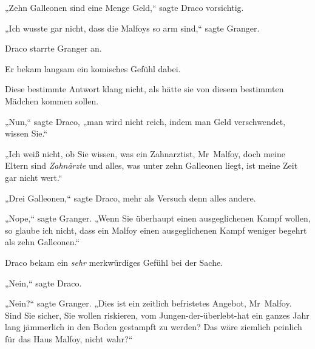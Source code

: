 „Zehn Galleonen sind eine Menge Geld,“ sagte Draco vorsichtig.

„Ich wusste gar nicht, dass die Malfoys so arm sind,“ sagte Granger.

Draco starrte Granger an.

Er bekam langsam ein komisches Gefühl dabei.

Diese bestimmte Antwort klang nicht, als hätte sie von diesem bestimmten Mädchen kommen sollen.

„Nun,“ sagte Draco, „man wird nicht reich, indem man Geld verschwendet, wissen Sie.“

„Ich weiß nicht, ob Sie wissen, was ein Zahnarztist, Mr~Malfoy, doch meine Eltern sind \emph{Zahnärzte} und alles, was unter zehn Galleonen liegt, ist meine Zeit gar nicht wert.“

„Drei Galleonen,“ sagte Draco, mehr als Versuch denn alles andere.

„Nope,“ sagte Granger. „Wenn Sie überhaupt einen ausgeglichenen Kampf wollen, so glaube ich nicht, dass ein Malfoy einen ausgeglichenen Kampf weniger begehrt als zehn Galleonen.“

Draco bekam ein \emph{sehr} merkwürdiges Gefühl bei der Sache.

„Nein,“ sagte Draco.

„Nein?“ sagte Granger. „Dies ist ein zeitlich befristetes Angebot, Mr~Malfoy. Sind Sie sicher, Sie wollen riskieren, vom Jungen-der-überlebt-hat ein ganzes Jahr lang jämmerlich in den Boden gestampft zu werden? Das wäre ziemlich peinlich für das Haus Malfoy, nicht wahr?“

